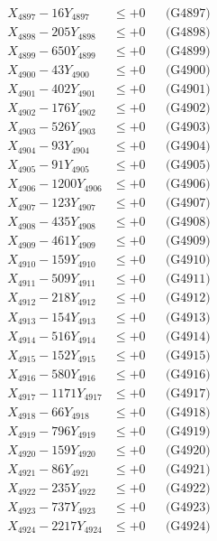 \documentclass[a4paper,10pt]{article}
\begin{document}
{\begin{align}
X_{4897} - 16Y_{4897} &\leq +0 && \text{(G4897)} \\
X_{4898} - 205Y_{4898} &\leq +0 && \text{(G4898)} \\
X_{4899} - 650Y_{4899} &\leq +0 && \text{(G4899)} \\
X_{4900} - 43Y_{4900} &\leq +0 && \text{(G4900)} \\
\allowbreak
X_{4901} - 402Y_{4901} &\leq +0 && \text{(G4901)} \\
X_{4902} - 176Y_{4902} &\leq +0 && \text{(G4902)} \\
X_{4903} - 526Y_{4903} &\leq +0 && \text{(G4903)} \\
X_{4904} - 93Y_{4904} &\leq +0 && \text{(G4904)} \\
X_{4905} - 91Y_{4905} &\leq +0 && \text{(G4905)} \\
X_{4906} - 1200Y_{4906} &\leq +0 && \text{(G4906)} \\
X_{4907} - 123Y_{4907} &\leq +0 && \text{(G4907)} \\
X_{4908} - 435Y_{4908} &\leq +0 && \text{(G4908)} \\
X_{4909} - 461Y_{4909} &\leq +0 && \text{(G4909)} \\
X_{4910} - 159Y_{4910} &\leq +0 && \text{(G4910)} \\
\allowbreak
X_{4911} - 509Y_{4911} &\leq +0 && \text{(G4911)} \\
X_{4912} - 218Y_{4912} &\leq +0 && \text{(G4912)} \\
X_{4913} - 154Y_{4913} &\leq +0 && \text{(G4913)} \\
X_{4914} - 516Y_{4914} &\leq +0 && \text{(G4914)} \\
X_{4915} - 152Y_{4915} &\leq +0 && \text{(G4915)} \\
X_{4916} - 580Y_{4916} &\leq +0 && \text{(G4916)} \\
X_{4917} - 1171Y_{4917} &\leq +0 && \text{(G4917)} \\
X_{4918} - 66Y_{4918} &\leq +0 && \text{(G4918)} \\
X_{4919} - 796Y_{4919} &\leq +0 && \text{(G4919)} \\
X_{4920} - 159Y_{4920} &\leq +0 && \text{(G4920)} \\
\allowbreak
X_{4921} - 86Y_{4921} &\leq +0 && \text{(G4921)} \\
X_{4922} - 235Y_{4922} &\leq +0 && \text{(G4922)} \\
X_{4923} - 737Y_{4923} &\leq +0 && \text{(G4923)} \\
X_{4924} - 2217Y_{4924} &\leq +0 && \text{(G4924)} \\

\end{align}}
\end{document}
